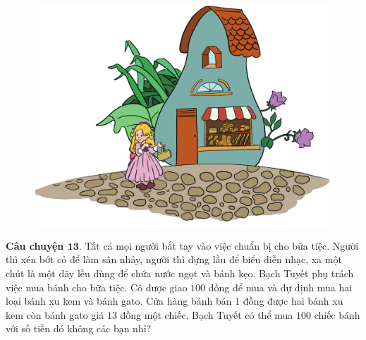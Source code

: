 	\vskip 0.1cm
		\begin{figure}
		\centering
		\vspace*{5pt}
		\captionsetup{labelformat= empty, justification=centering}
		\includegraphics[width=1\linewidth]{Hinh15_BachTuyet}
		\vspace*{-15pt}
	\end{figure}
	\textbf{\color{toancuabi}Câu chuyện $\pmb{13.}$} Tất cả mọi người bắt tay vào việc chuẩn bị cho bữa tiệc. Người thì xén bớt cỏ để làm sân nhảy, người thì dựng lầu để biểu diễn nhạc, xa một chút là một dãy lều dùng để chứa nước ngọt và bánh kẹo. Bạch Tuyết phụ trách việc mua bánh cho bữa tiệc. Cô được giao $100$ đồng để mua và dự định mua hai loại bánh xu kem và bánh gato. Cửa hàng bánh bán $1$ đồng được hai bánh xu kem còn bánh gato giá $13$ đồng một chiếc. Bạch Tuyết có thể mua $100$ chiếc bánh với số tiền đó không các bạn nhỉ?
	\vskip 0.1cm
